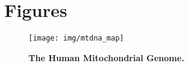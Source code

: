 \appendix
\chapter{Figures}

\begin{center}

\begin{figure}[p]
\texttt{[image: img/mtdna\_map]}
\caption{\textbf{The Human Mitochondrial Genome.}}
\label{fig:mtdna_map}
\end{figure}

\end{center}